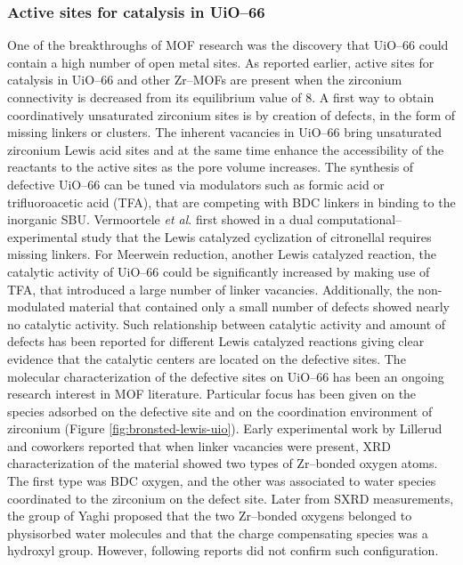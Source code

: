 \subsubsection*{Active sites for catalysis in UiO--66}
One of the breakthroughs of MOF research was the discovery that UiO--66 could contain a high number of open metal sites. As reported earlier, active sites for catalysis in UiO--66 and other Zr--MOFs are present when the zirconium connectivity is decreased from its equilibrium value of 8.
\npar
A first way to obtain coordinatively unsaturated zirconium sites is by creation of defects, in the form of missing linkers or clusters. The inherent vacancies in UiO--66 bring unsaturated zirconium Lewis acid sites\cite{wu2013unusual, shearer2014tuned, vermoortele2013synthesis, vandichel2015active, liu2016probing} and at the same time enhance the accessibility of the reactants to the active sites as the pore volume increases. The synthesis of defective UiO--66 can be tuned via modulators such as formic acid or trifluoroacetic acid (TFA), that are competing with BDC linkers in binding to the inorganic SBU. 
Vermoortele \textit{et al}. first showed in a dual computational--experimental study that the Lewis catalyzed cyclization of citronellal requires missing linkers\cite{vermoortele2012electronic}. For Meerwein reduction, another Lewis catalyzed reaction, the catalytic activity of UiO--66 could be significantly increased by making use of TFA, that introduced a large number of linker vacancies. Additionally, the non-modulated material that contained only a small number of defects showed nearly no catalytic activity\cite{vermoortele2013synthesis}. Such relationship between catalytic activity and amount of defects has been reported for different Lewis catalyzed reactions giving clear evidence that the catalytic centers are located on the defective sites\cite{vermoortele2012electronic, vermoortele2013synthesis}. 
\npar
The molecular characterization of the defective sites on UiO--66 has been an ongoing research interest in MOF literature. Particular focus has been given on the species adsorbed on the defective site and on the coordination environment of zirconium (Figure \ref{fig:bronsted-lewis-uio}). Early experimental work by Lillerud and coworkers \cite{oien2014detailed} reported that when linker vacancies were present, XRD characterization of the material showed two types of Zr--bonded oxygen atoms. The first type was BDC oxygen, and the other was associated to water species coordinated to the zirconium on the defect site. Later from SXRD measurements, the group of Yaghi \cite{trickett2015definitive} proposed that the two Zr--bonded oxygens belonged to physisorbed water molecules and that the charge compensating species was a hydroxyl group. However, following reports did not confirm such configuration.

